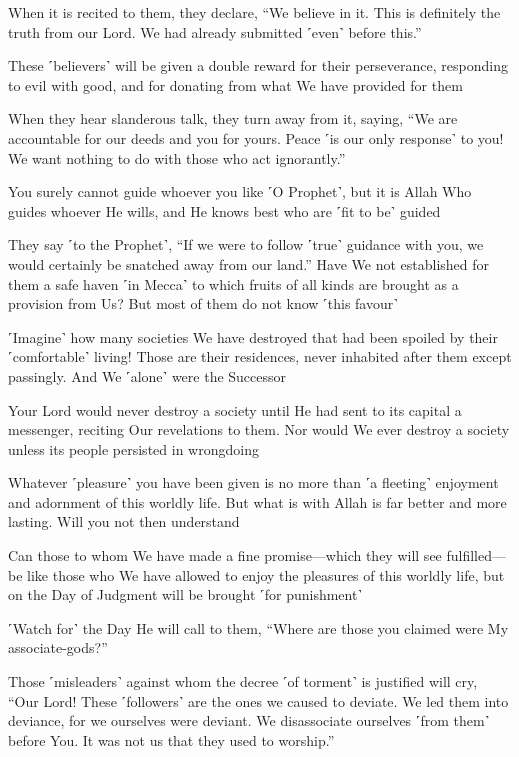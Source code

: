 When it is recited to them, they declare, “We believe in it. This is definitely the truth from our Lord. We had already submitted ˹even˺ before this.”

These ˹believers˺ will be given a double reward for their perseverance, responding to evil with good, and for donating from what We have provided for them

When they hear slanderous talk, they turn away from it, saying, “We are accountable for our deeds and you for yours. Peace ˹is our only response˺ to you! We want nothing to do with those who act ignorantly.”

You surely cannot guide whoever you like ˹O Prophet˺, but it is Allah Who guides whoever He wills, and He knows best who are ˹fit to be˺ guided

They say ˹to the Prophet˺, “If we were to follow ˹true˺ guidance with you, we would certainly be snatched away from our land.” Have We not established for them a safe haven ˹in Mecca˺ to which fruits of all kinds are brought as a provision from Us? But most of them do not know ˹this favour˺

˹Imagine˺ how many societies We have destroyed that had been spoiled by their ˹comfortable˺ living! Those are their residences, never inhabited after them except passingly. And We ˹alone˺ were the Successor

Your Lord would never destroy a society until He had sent to its capital a messenger, reciting Our revelations to them. Nor would We ever destroy a society unless its people persisted in wrongdoing

Whatever ˹pleasure˺ you have been given is no more than ˹a fleeting˺ enjoyment and adornment of this worldly life. But what is with Allah is far better and more lasting. Will you not then understand

Can those to whom We have made a fine promise—which they will see fulfilled—be like those who We have allowed to enjoy the pleasures of this worldly life, but on the Day of Judgment will be brought ˹for punishment˺

˹Watch for˺ the Day He will call to them, “Where are those you claimed were My associate-gods?”

Those ˹misleaders˺ against whom the decree ˹of torment˺ is justified will cry, “Our Lord! These ˹followers˺ are the ones we caused to deviate. We led them into deviance, for we ourselves were deviant. We disassociate ourselves ˹from them˺ before You. It was not us that they used to worship.”

